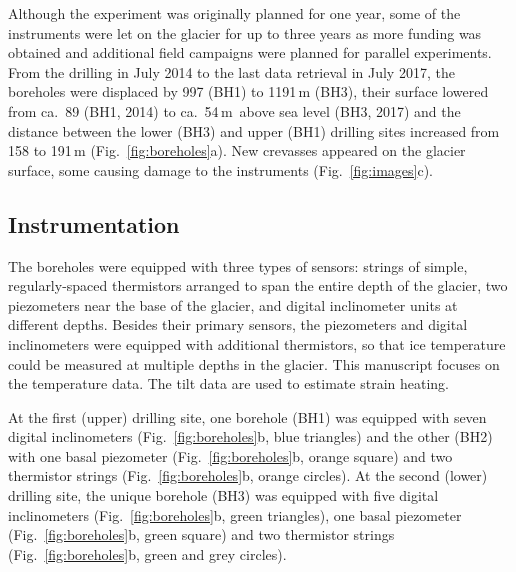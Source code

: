 \documentclass[utf8]{article}
\begin{document}
    Although the experiment was originally planned for one year, some of the
    instruments were let on the glacier for up to three years as more funding
    was obtained and additional field campaigns were planned for parallel
    experiments. From the drilling in July 2014 to the last data retrieval in
    July 2017, the boreholes were displaced by 997 (BH1) to 1191\,m (BH3),
    their surface lowered from ca.~89 (BH1, 2014) to ca.~54\,m~above sea level
    (BH3, 2017) and
    the distance between the lower (BH3) and upper (BH1) drilling sites
    increased from 158 to 191\,m (Fig.~\ref{fig:boreholes}a). New crevasses
    appeared on the glacier surface, some causing damage to the instruments
    (Fig.~\ref{fig:images}c).


\subsection{Instrumentation}

    The boreholes were equipped with three types of sensors: strings of simple,
    regularly-spaced thermistors arranged to span the entire depth of the
    glacier, two piezometers near the base of the glacier, and digital
    inclinometer units at different depths. Besides their primary sensors, the
    piezometers and digital inclinometers were equipped with additional
    thermistors, so that ice temperature could be measured at multiple depths
    in the glacier. This manuscript focuses on the temperature data. The tilt
    data are used to estimate strain heating.

    At the first (upper) drilling site, one borehole (BH1) was equipped with
    seven digital inclinometers (Fig.~\ref{fig:boreholes}b, blue triangles) and
    the other (BH2) with one basal piezometer (Fig.~\ref{fig:boreholes}b,
    orange square) and two thermistor strings (Fig.~\ref{fig:boreholes}b,
    orange circles). At the second (lower) drilling site, the unique
    borehole (BH3) was equipped with five digital inclinometers
    (Fig.~\ref{fig:boreholes}b, green triangles), one basal piezometer
    (Fig.~\ref{fig:boreholes}b, green square) and two thermistor strings
    (Fig.~\ref{fig:boreholes}b, green and grey circles).
\end{document}
